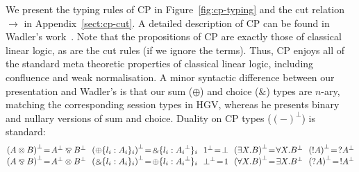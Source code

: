 \documentclass{easychair}
\makeatletter
\newcommand{\ba}{\begin{array}}
\newcommand{\ea}{\end{array}}
\newcommand{\bl}{\ba{@{}c@{}}}
\newcommand{\el}{\ea}
\newcommand{\set}[1]{\{ #1 \}}
\newcommand{\row}[2]{\set{#1}_{#2}}
\newcommand{\la}{l}
\newcommand{\cpTimes}[2]{{#1} \otimes {#2}}
\newcommand{\cpPar}[2]{{#1} \mathbin{\bindnasrepma} {#2}}
\newcommand{\cpPlus}[2]{\oplus \row{#1}{#2}}
\newcommand{\cpWith}[2]{\binampersand \row{#1}{#2}}
\newcommand{\cpOne}{1}
\newcommand{\cpBottom}{\bot}
\newcommand{\cpOfCourse}[1]{\mathord{!}{#1}}
\newcommand{\cpWhyNot}[1]{\mathord{?}{#1}}
\newcommand{\cpDual}[1]{{#1}^\bot}
\newcommand{\cpExists}[2]{\exists {#1}.{#2}}
\newcommand{\cpForall}[2]{\forall {#1}.{#2}}
\newcommand{\hgv}{HGV\xspace}
\newcommand{\redto}{\longrightarrow}
\makeatother
\begin{document}
We present the typing rules of CP in Figure~\ref{fig:cp-typing} and the cut relation $\redto$ in
Appendix~\ref{sect:cp-cut}. A detailed description of CP can be found in Wadler's
work~\cite{Wadler12}. Note that the propositions of CP are exactly those of classical linear logic,
as are the cut rules (if we ignore the terms). Thus, CP enjoys all of the standard meta theoretic
properties of classical linear logic, including confluence and weak normalisation.
%
A minor syntactic difference between our presentation and Wadler's is that our sum ($\oplus$) and
choice ($\binampersand$) types are $n$-ary, matching the corresponding session types in \hgv,
whereas he presents binary and nullary versions of sum and choice.
%
Duality on CP types ($\cpDual{(-)}$) is standard:
\[
\bl
  \cpDual{(\cpTimes{A}{B})} \!=\! \cpPar{\cpDual{A}}{\cpDual{B}}
~~
  \cpDual{(\cpPlus{\la_i:A_i}{i})} \!=\! \cpWith{\la_i:\cpDual{A_i}}{i}
~~
  \cpDual{\cpOne} \!=\! \cpBottom
~~
  \cpDual{(\cpExists{X}{B})} \!=\! \cpForall{X}{\cpDual{B}}
~~
  \cpDual{(\cpOfCourse{A})} \!=\! \cpWhyNot{\cpDual{A}}
\\
  \cpDual{(\cpPar{A}{B})} \!=\! \cpTimes{\cpDual{A}}{\cpDual{B}}
~~
  \cpDual{(\cpWith{\la_i:A_i}{i})} \!=\! \cpPlus{\la_i:\cpDual{A_i}}{i}
~~
  \cpDual{\cpBottom} \!=\! \cpOne
~~
  \cpDual{(\cpForall{X}{B})} \!=\! \cpExists{X}{\cpDual{B}}
~~
  \cpDual{(\cpWhyNot{A})} \!=\! \cpOfCourse{\cpDual{A}}
\\
\el
\]
\end{document}
